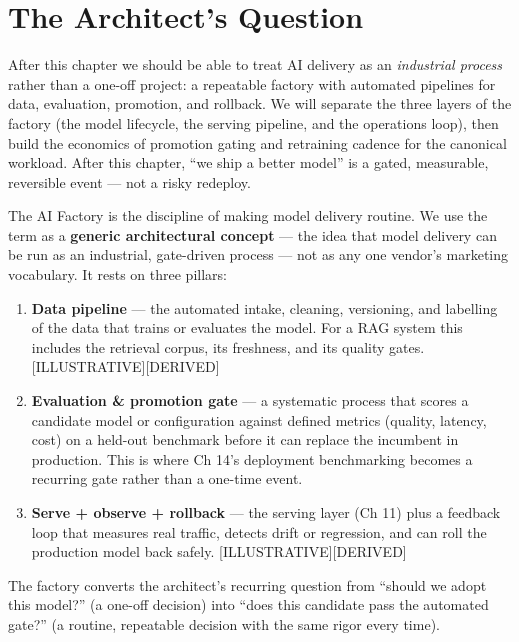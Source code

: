 \section*{The Architect's Question}\label{the-architects-question}

After this chapter we should be able to treat AI delivery as an
\emph{industrial process} rather than a one-off project: a repeatable
factory with automated pipelines for data, evaluation, promotion, and
rollback. We will separate the three layers of the factory (the model
lifecycle, the serving pipeline, and the operations loop), then build
the economics of promotion gating and retraining cadence for the
canonical workload. After this chapter, ``we ship a better model'' is a
gated, measurable, reversible event --- not a risky redeploy.

\label{concept}


The AI Factory is the discipline of making model delivery routine. We
use the term as a \textbf{generic architectural concept} --- the idea
that model delivery can be run as an industrial, gate-driven process ---
not as any one vendor's marketing vocabulary. It rests on three pillars:

\begin{enumerate}
\def\labelenumi{\arabic{enumi}.}
\item
  \textbf{Data pipeline} --- the automated intake, cleaning, versioning,
  and labelling of the data that trains or evaluates the model. For a
  RAG system this includes the retrieval corpus, its freshness, and its
  quality gates. \mbox{{[}ILLUSTRATIVE{]}}\hspace{0pt}\mbox{{[}DERIVED{]}}
\item
  \textbf{Evaluation \& promotion gate} --- a systematic process that
  scores a candidate model or configuration against defined metrics
  (quality, latency, cost) on a held-out benchmark before it can replace
  the incumbent in production. This is where Ch 14's deployment
  benchmarking becomes a recurring gate rather than a one-time event.
\item
  \textbf{Serve + observe + rollback} --- the serving layer (Ch 11) plus
  a feedback loop that measures real traffic, detects drift or
  regression, and can roll the production model back safely.
  \mbox{{[}ILLUSTRATIVE{]}}\hspace{0pt}\mbox{{[}DERIVED{]}}
\end{enumerate}

The factory converts the architect's recurring question from ``should we
adopt this model?'' (a one-off decision) into ``does this candidate pass
the automated gate?'' (a routine, repeatable decision with the same
rigor every time).


